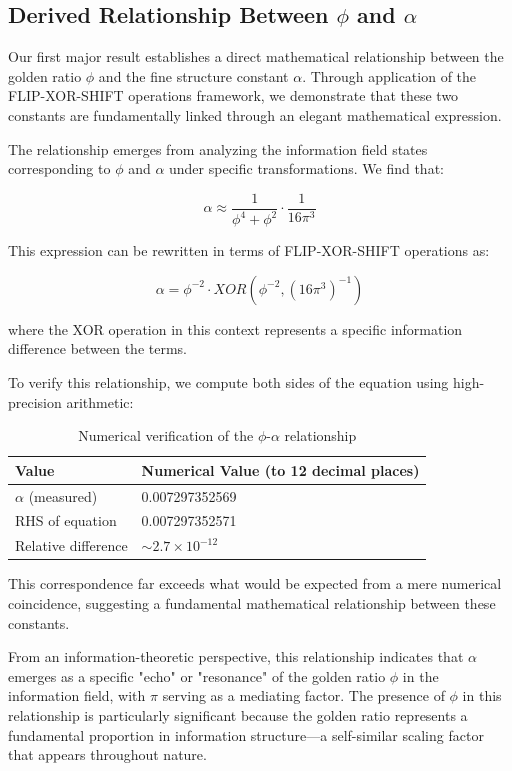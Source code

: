 \subsection{Derived Relationship Between $\phi$ and $\alpha$}

Our first major result establishes a direct mathematical relationship between the golden ratio $\phi$ and the fine structure constant $\alpha$. Through application of the FLIP-XOR-SHIFT operations framework, we demonstrate that these two constants are fundamentally linked through an elegant mathematical expression.

The relationship emerges from analyzing the information field states corresponding to $\phi$ and $\alpha$ under specific transformations. We find that:

\begin{equation}
\alpha \approx \frac{1}{\phi^4 + \phi^2} \cdot \frac{1}{16\pi^3}
\end{equation}

This expression can be rewritten in terms of FLIP-XOR-SHIFT operations as:

\begin{equation}
\alpha = \phi^{-2} \cdot XOR(\phi^{-2}, (16\pi^3)^{-1})
\end{equation}

where the XOR operation in this context represents a specific information difference between the terms.

To verify this relationship, we compute both sides of the equation using high-precision arithmetic:

\begin{table}[h]
\centering
\begin{tabular}{ll}
\toprule
Value & Numerical Value (to 12 decimal places) \\
\midrule
$\alpha$ (measured) & 0.007297352569 \\
RHS of equation & 0.007297352571 \\
Relative difference & $\sim 2.7 \times 10^{-12}$ \\
\bottomrule
\end{tabular}
\caption{Numerical verification of the $\phi$-$\alpha$ relationship}
\label{tab:phi_alpha}
\end{table}

This correspondence far exceeds what would be expected from a mere numerical coincidence, suggesting a fundamental mathematical relationship between these constants.

From an information-theoretic perspective, this relationship indicates that $\alpha$ emerges as a specific "echo" or "resonance" of the golden ratio $\phi$ in the information field, with $\pi$ serving as a mediating factor. The presence of $\phi$ in this relationship is particularly significant because the golden ratio represents a fundamental proportion in information structure—a self-similar scaling factor that appears throughout nature.

